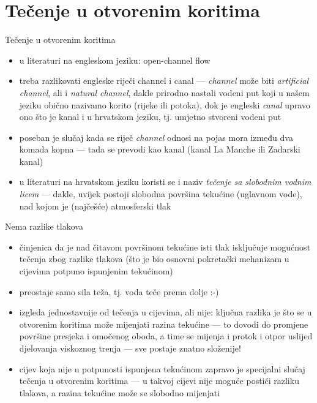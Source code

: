 \documentclass[croatian]{beamer}
\begin{document}
\naslovnislajd

\section{Tečenje u otvorenim koritima}
\begin{frame}{Tečenje u otvorenim koritima}

\begin{itemize}
\item u literaturi na engleskom jeziku: \alert{open-channel flow}
\item treba razlikovati engleske riječi \alert{channel} i \alert{canal}
--- \emph{channel} može biti \emph{artificial channel}, ali i \emph{natural
channel}, dakle prirodno nastali vodeni put koji u našem jeziku obično
nazivamo korito (rijeke ili potoka), dok je engleski \emph{canal}
upravo ono što je kanal i u hrvatskom jeziku, tj. umjetno stvoreni
vodeni put
\item poseban je slučaj kada se riječ\emph{ channel} odnosi na pojas mora
između dva komada kopna --- tada se prevodi kao kanal (kanal La Manche
ili Zadarski kanal)
\item u literaturi na hrvatskom jeziku koristi se i naziv \emph{tečenje
sa slobodnim vodnim licem} --- dakle, uvijek postoji slobodna površina
tekućine (uglavnom vode), nad kojom je (najčešće) atmosferski tlak
\end{itemize}
\end{frame}

\begin{frame}{Nema razlike tlakova}

\begin{itemize}
\item činjenica da je nad čitavom površinom tekućine isti tlak isključuje
mogućnost tečenja zbog razlike tlakova (što je bio osnovni pokretački
mehanizam u cijevima potpuno ispunjenim tekućinom)
\item preostaje samo sila teža, tj. voda teče prema dolje :-)
\item izgleda jednostavnije od tečenja u cijevima, ali nije: ključna razlika
je što se u otvorenim koritima može mijenjati razina tekućine ---
to dovodi do promjene površine presjeka i omočenog oboda, a time se
mijenja i protok i otpor uslijed djelovanja viskoznog trenja ---
sve postaje znatno složenije!
\item cijev koja nije u potpunosti ispunjena tekućinom zapravo je specijalni
slučaj tečenja u otvorenim koritima --- u takvoj cijevi nije moguće
postići razliku tlakova, a razina tekućine može se slobodno mijenjati
\end{itemize}
\end{frame}
\end{document}
